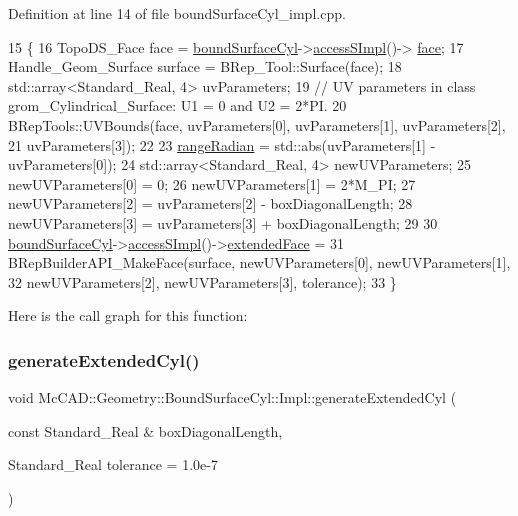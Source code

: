 Definition at line 14 of file bound\+Surface\+Cyl\+\_\+impl.\+cpp.


\begin{DoxyCode}
15                                                                         \{
16   TopoDS\_Face face = \hyperlink{classMcCAD_1_1Geometry_1_1BoundSurfaceCyl_1_1Impl_a0b0405eb48ad796bd99abe5af5b994ca}{boundSurfaceCyl}->\hyperlink{classMcCAD_1_1Geometry_1_1Surface_a989de1f9ebe3de043412014ed25e52eb}{accessSImpl}()->
      \hyperlink{classMcCAD_1_1Geometry_1_1Surface_1_1Impl_abf7c4dc859404ce42b425c7d6b578f69}{face};
17   Handle\_Geom\_Surface surface = BRep\_Tool::Surface(face);
18   std::array<Standard\_Real, 4> uvParameters;
19   \textcolor{comment}{// UV parameters in class grom\_Cylindrical\_Surface: U1 = 0 and U2 = 2*PI.}
20   BRepTools::UVBounds(face, uvParameters[0], uvParameters[1], uvParameters[2],
21           uvParameters[3]);
22 
23   \hyperlink{classMcCAD_1_1Geometry_1_1BoundSurfaceCyl_1_1Impl_ac40ad6964d82450fa6606efd82ac824f}{rangeRadian} = std::abs(uvParameters[1] - uvParameters[0]);
24   std::array<Standard\_Real, 4> newUVParameters;
25   newUVParameters[0] = 0;
26   newUVParameters[1] = 2*M\_PI;
27   newUVParameters[2] = uvParameters[2] - boxDiagonalLength;
28   newUVParameters[3] = uvParameters[3] + boxDiagonalLength;
29 
30   \hyperlink{classMcCAD_1_1Geometry_1_1BoundSurfaceCyl_1_1Impl_a0b0405eb48ad796bd99abe5af5b994ca}{boundSurfaceCyl}->\hyperlink{classMcCAD_1_1Geometry_1_1Surface_a989de1f9ebe3de043412014ed25e52eb}{accessSImpl}()->\hyperlink{classMcCAD_1_1Geometry_1_1Surface_1_1Impl_afaca81a1a3f54b93988737ac7085a0f2}{extendedFace} =
31     BRepBuilderAPI\_MakeFace(surface, newUVParameters[0], newUVParameters[1],
32           newUVParameters[2], newUVParameters[3], tolerance);
33 \}
\end{DoxyCode}
Here is the call graph for this function\+:
\mbox{\label{classMcCAD_1_1Geometry_1_1BoundSurfaceCyl_1_1Impl_a53df9dd2413cd4087f9ae38af08ed9b3}} 
\subsubsection{\texorpdfstring{generate\+Extended\+Cyl()}{generateExtendedCyl()}\hspace{0.1cm}{\footnotesize\ttfamily [2/2]}}
{\footnotesize\ttfamily void Mc\+C\+A\+D\+::\+Geometry\+::\+Bound\+Surface\+Cyl\+::\+Impl\+::generate\+Extended\+Cyl (\begin{DoxyParamCaption}\item[{const Standard\+\_\+\+Real \&}]{box\+Diagonal\+Length,  }\item[{Standard\+\_\+\+Real}]{tolerance = {\ttfamily 1.0e-\/7} }\end{DoxyParamCaption})}




